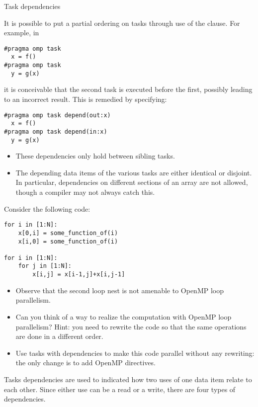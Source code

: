  {Task dependencies}
\label{sec:omp-task-depend}

It is possible to put a partial ordering on
tasks through use of the  clause. For example, in
\begin{lstlisting}
#pragma omp task
  x = f()
#pragma omp task
  y = g(x)
\end{lstlisting}
it is conceivable that the second task is executed before the first,
possibly leading to an incorrect result. This is remedied by specifying:
\begin{lstlisting}
#pragma omp task depend(out:x)
  x = f()
#pragma omp task depend(in:x)
  y = g(x)
\end{lstlisting}

\begin{itemize}
\item
  These dependencies only hold between sibling tasks.
\item The depending data items of the various tasks
  are either identical or disjoint.
  In particular, dependencies on different sections of an array
  are not allowed, though a compiler may not always catch this.
\end{itemize}

\begin{exercise}
Consider the following code:
\begin{lstlisting}
for i in [1:N]:
    x[0,i] = some_function_of(i)
    x[i,0] = some_function_of(i)

for i in [1:N]:
    for j in [1:N]:
        x[i,j] = x[i-1,j]+x[i,j-1]
\end{lstlisting}
\begin{itemize}
\item Observe that the second loop nest is not amenable to OpenMP loop
  parallelism.
\item Can you think of a way to realize the computation with OpenMP
  loop parallelism? Hint: you need to rewrite the code so that the
  same operations are done in a different order.
\item Use tasks with dependencies to make this code parallel without
  any rewriting: the only change is to add OpenMP directives.
\end{itemize}
\end{exercise}

Tasks dependencies are used to indicated how two uses of one data item
relate to each other. Since either use can be a read or a write,
there are four types of dependencies.


